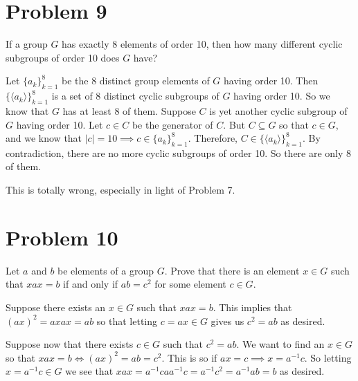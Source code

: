 \documentclass{article}
\begin{document}
\section*{Problem 9}

If a group $G$ has exactly 8 elements of order 10, then how many
different cyclic subgroups of order 10 does $G$ have?

Let $\{a_k\}_{k=1}^8$ be the 8 distinct group elements of $G$ having order 10.
Then $\{\langle a_k\rangle\}_{k=1}^8$ is a set of 8 distinct cyclic subgroups of
$G$ having order 10.  So we know that $G$ has at least 8 of them.  Suppose $C$
is yet another cyclic subgroup of $G$ having order 10.  Let $c\in C$ be the
generator of $C$.  But $C\subseteq G$ so that $c\in G$, and we know that
$|c|=10\implies c\in\{a_k\}_{k=1}^8$.
Therefore, $C\in\{\langle a_k\rangle\}_{k=1}^8$.  By contradiction, there are
no more cyclic subgroups of order 10.  So there are only 8 of them.

This is totally wrong, especially in light of Problem 7.

\section*{Problem 10}

Let $a$ and $b$ be elements of a group $G$.  Prove that there is an element $x\in G$ such
that $xax=b$ if and only if $ab=c^2$ for some element $c\in G$.

Suppose there exists an $x\in G$ such that $xax=b$.  This implies that $(ax)^2=axax=ab$
so that letting $c=ax\in G$ gives us $c^2=ab$ as desired.

Suppose now that there exists $c\in G$ such that $c^2=ab$.  We want to find an $x\in G$
so that $xax=b\Leftrightarrow (ax)^2=ab=c^2$.  This is so if $ax=c\implies x=a^{-1}c$.
So letting $x=a^{-1}c\in G$ we see that $xax=a^{-1}caa^{-1}c = a^{-1}c^2= a^{-1}ab = b$
as desired.
\end{document}
